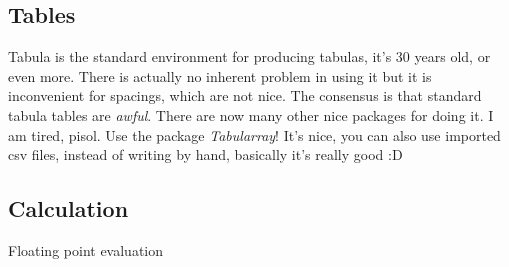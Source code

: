 \documentclass[]{report}
\begin{document}
\subsection{Tables}
Tabula is the standard environment for producing tabulas, it's 30 years old, or even more.
There is actually no inherent problem in using it but it is inconvenient for spacings, which are not nice. The consensus is that standard tabula tables are \emph{awful}.
There are now many other nice packages for doing it. I am tired, pisol.
Use the package \emph{Tabularray}! It's nice, you can also use imported csv files, instead of writing by hand, basically it's really good :D \\

\subsection{Calculation}
Floating point evaluation 
\end{document}
